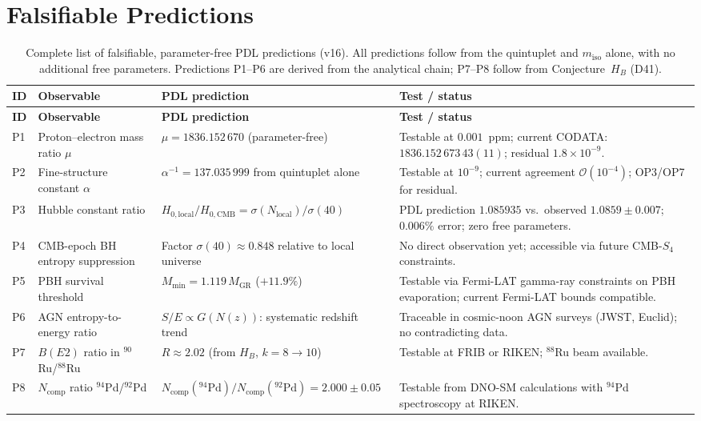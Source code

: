 \documentclass[11pt,a4paper]{article}
\theoremstyle{plain}
\theoremstyle{definition}
\theoremstyle{remark}
\begin{document}
\section{Falsifiable Predictions}
\label{sec:predictions}

\begin{longtable}{L{0.5cm}L{3.2cm}L{5.2cm}L{4.2cm}}
\caption{Complete list of falsifiable, parameter-free PDL predictions (v16). All predictions follow from the quintuplet and $m_{\mathrm{iso}}$ alone, with no additional free parameters. Predictions P1--P6 are derived from the analytical chain; P7--P8 follow from Conjecture~$H_B$ (D41).}
\label{tab:predictions}\\
\toprule
\textbf{ID} & \textbf{Observable} & \textbf{PDL prediction} & \textbf{Test / status}\\
\midrule
\endfirsthead
\toprule
\textbf{ID} & \textbf{Observable} & \textbf{PDL prediction} & \textbf{Test / status}\\
\midrule
\endhead
\bottomrule
\endfoot
P1 & Proton--electron mass ratio $\mu$ & $\mu=1836.152\,670$ (parameter-free) & Testable at $0.001$~ppm; current CODATA: $1836.152\,673\,43(11)$; residual $1.8\times10^{-9}$.\\[0.4em]
P2 & Fine-structure constant $\alpha$ & $\alpha^{-1}=137.035\,999$ from quintuplet alone & Testable at $10^{-9}$; current agreement $\mathcal{O}(10^{-4})$; OP3/OP7 for residual.\\[0.4em]
P3 & Hubble constant ratio & $H_{0,\mathrm{local}}/H_{0,\mathrm{CMB}}=\sigma(N_{\mathrm{local}})/\sigma(40)$ & PDL prediction $1.085935$ vs.\ observed $1.0859\pm0.007$; $0.006\%$ error; zero free parameters.\\[0.4em]
P4 & CMB-epoch BH entropy suppression & Factor $\sigma(40)\approx 0.848$ relative to local universe & No direct observation yet; accessible via future CMB-$S_4$ constraints.\\[0.4em]
P5 & PBH survival threshold & $M_{\min}=1.119\,M_{\mathrm{GR}}$ ($+11.9\%$) & Testable via Fermi-LAT gamma-ray constraints on PBH evaporation; current Fermi-LAT bounds compatible.\\[0.4em]
P6 & AGN entropy-to-energy ratio & $S/E\propto G(N(z))$: systematic redshift trend & Traceable in cosmic-noon AGN surveys (JWST, Euclid); no contradicting data.\\[0.4em]
P7 & $B(E2)$ ratio in $^{90}$Ru/$^{88}$Ru & $R\approx 2.02$ (from $H_B$, $k=8\to10$) & Testable at FRIB or RIKEN; $^{88}$Ru beam available.\\[0.4em]
P8 & $N_{\mathrm{comp}}$ ratio $^{94}$Pd/$^{92}$Pd & $N_{\mathrm{comp}}(^{94}\mathrm{Pd})/N_{\mathrm{comp}}(^{92}\mathrm{Pd})=2.000\pm0.05$ & Testable from DNO-SM calculations with $^{94}$Pd spectroscopy at RIKEN.\\[0.4em]
\end{longtable}
\end{document}
